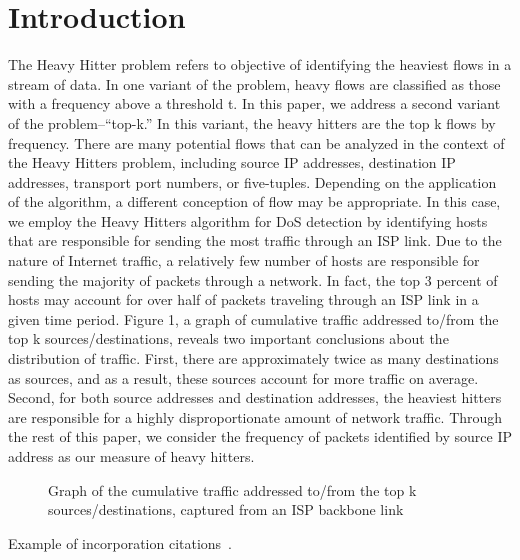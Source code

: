 \section{Introduction}
\label{sec:intro}
The Heavy Hitter problem refers to objective of identifying the heaviest flows in a stream of data. In one variant of the problem, heavy flows are classified as those with a frequency above a threshold t. In this paper, we address a second variant of the problem--``top-k.'' In this variant, the heavy hitters are the top k flows by frequency. 
There are many potential flows that can be analyzed in the context of the Heavy Hitters problem, including source IP addresses, destination IP addresses, transport port numbers, or five-tuples. Depending on the application of the algorithm, a different conception of flow may be appropriate. In this case, we employ the Heavy Hitters algorithm for DoS detection by identifying hosts that are responsible for sending the most traffic through an ISP link. Due to the nature of Internet traffic, a relatively few number of hosts are responsible for sending the majority of packets through a network. In fact, the top 3 percent of hosts may account for over half of packets traveling through an ISP link in a given time period. Figure 1, a graph of cumulative traffic addressed to/from the top k sources/destinations, reveals two important conclusions about the distribution of traffic. First, there are approximately twice as many destinations as sources, and as a result, these sources account for more traffic on average. Second, for both source addresses and destination addresses, the heaviest hitters are responsible for a highly disproportionate amount of network traffic. Through the rest of this paper, we consider the frequency of packets identified by source IP address as our measure of heavy hitters.

\begin{figure}[t]
  \centering
     \caption{Graph of the cumulative traffic addressed to/from the top k sources/destinations, captured from an ISP backbone link}
     \label{fig:bp-image}
\end{figure}

Example of incorporation citations~\cite{coral:nsdi04}.


